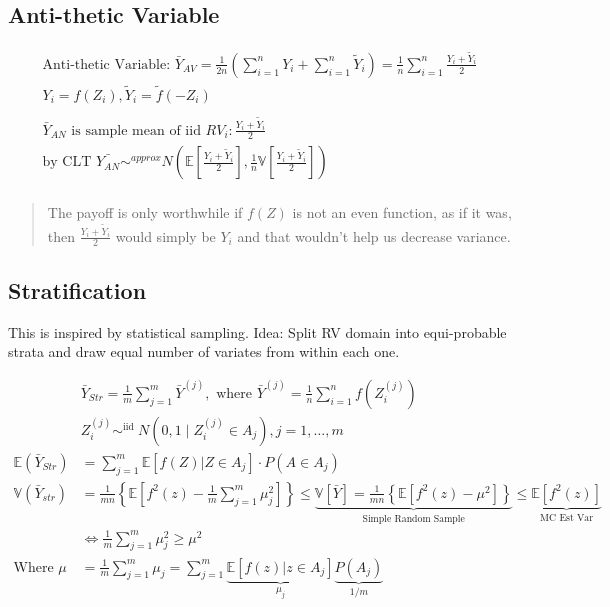 \documentclass[
  oneside]{book}
\begin{document}
\hypertarget{anti-thetic-variable}{%
\subsection{Anti-thetic Variable}\label{anti-thetic-variable}}

\[
\begin{gathered}
\text{Anti-thetic Variable: } \bar{Y}_{AV} = \frac{1}{2n} \left( \sum^{n}_{i=1}Y_{i} + \sum^{n}_{i=1}\tilde{Y}_{i} \right) = \frac{1}{n}\sum^{n}_{i=1} \frac{Y_{i}+\tilde{Y}_{i}}{2}\\
Y_{i} = f(Z_{i}), \tilde{Y}_{i} = \tilde{f}(-Z_{i})\\
\\
\bar{Y}_{AN} \text{ is sample mean of iid } RV_i:\frac{Y_{i}+\tilde{Y}_{i}}{2}\\
\text{by CLT } \bar{Y_{AN}} \sim^{approx} N\left( \mathbb{E}\left[ \frac{Y_{i}+\tilde{Y}_{i}}{2} \right], \frac{1}{n} \mathbb{V}\left[ \frac{Y_{i}+\tilde{Y}_{i}}{2} \right] \right)\\
\end{gathered}
\]

\begin{quote}
The payoff is only worthwhile if \(f(Z)\) is not an even function, as if it was, then \(\frac{Y_{i}+\tilde{Y}_{i}}{2}\) would simply be \(Y_{i}\) and that wouldn't help us decrease variance.
\end{quote}

\hypertarget{stratification-1}{%
\subsection{Stratification}\label{stratification-1}}

This is inspired by statistical sampling.
Idea: Split RV domain into equi-probable strata and draw equal number of variates from within each one.

\[
\begin{aligned}
& \bar{Y}_{S t r}=\frac{1}{m} \sum_{j=1}^m \bar{Y}^{(j)}, \text { where } \bar{Y}^{(j)}=\frac{1}{n} \sum_{i=1}^n f\left(Z_i^{(j)}\right) \\
& Z_i^{(j)} \sim^{\text {iid }} N\left(0,1 \mid Z_i^{(j)} \in A_j\right), j=1, \ldots, m\\
\mathbb{E}(\bar{Y}_{Str}) &= \sum^{m}_{j=1}\mathbb{E}\left[ f(Z) | Z \in A_{j}\right] \cdot P(A \in A_{j})\\
\mathbb{V}(\bar{Y}_{str})&= \frac{1}{mn} \left\{ \mathbb{E}\left[ f^{2}(z) - \frac{1}{m}\sum^{m}_{j=1}\mu_{j}^{2}  \right]  \right\}
\leq \underbrace{ \mathbb{V}\left[ \bar{Y} \right] = \frac{1}{mn}\left\{ \mathbb{E}\left[ f^{2}(z)-\mu^{2} \right]  \right\}  }_{ \text{Simple Random Sample}  } \leq \underbrace{ \mathbb{E}[f^{2}(z)] }_{ \text{MC Est Var}  }\\
&\iff \frac{1}{m} \sum^{m}_{j=1} \mu_{j}^{2} \geq \mu^{2}\\
\text{Where } \mu &= \frac{1}{m} \sum^{m}_{j=1}\mu_{j} = \sum^{m}_{j=1}\underbrace{ \mathbb{E}\left[ f(z)|z\in A_{j} \right] }_{ \mu_{j} }\underbrace{ P(A_{j}) }_{ 1/m }
\end{aligned}
\]
\end{document}
